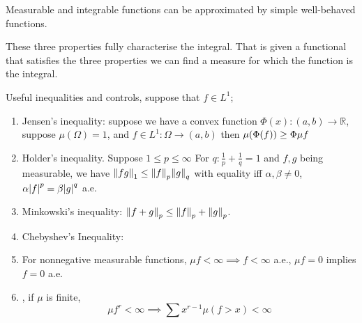 
\begin{thm}
    Measurable and integrable functions can be approximated by simple well-behaved functions.   
\end{thm}
\begin{thm}
    
\end{thm}

\begin{remark}
    These three properties fully characterise the integral. That is given a functional that satisfies the three properties we can find a measure for which the function is the integral. 
\end{remark}


\begin{thm}
    Useful inequalities and controls, suppose that \(f \in L^{1}\);
    \begin{enumerate}
        \item Jensen's inequality: suppose we have a convex function \(\Phi(x): (a,b) \to \mathbb{R}\), suppose \(\mu(\Omega)=1\), and \(f \in L^{1}: \Omega \to (a,b) \) then \(\mu\pqty{\Phi(f)} \geq \Phi \mu f\)
        \item Holder's inequality. Suppose \(1 \leq p \leq \infty\) For \(q: \frac{1}{p} + \frac{1}{q} = 1\) and \(f,g\) being measurable, we have \(\norm{fg}_{1} \leq \norm{f}_{p} \norm{g}_{q}\) with equality iff \(\alpha, \beta \neq 0\), \(\alpha \abs{f}^{p} = \beta \abs{g}^{q}\) a.e. 
        \item Minkowski's inequality: \(\norm{f + g}_{p} \leq \norm{f}_{p} + \norm{g}_{p}\).
        \item Chebyshev's Inequality: 
        \item For nonnegative measurable functions, \(\mu f < \infty  \implies f < \infty\) a.e., \(\mu f = 0\) implies \(f = 0\) a.e. 
        \item {}, if \(\mu\) is finite, 
        \begin{equation*}
            \mu f^{r} < \infty \implies \sum x^{r - 1} \mu(f> x) < \infty
        \end{equation*}
    \end{enumerate}    
\end{thm}

